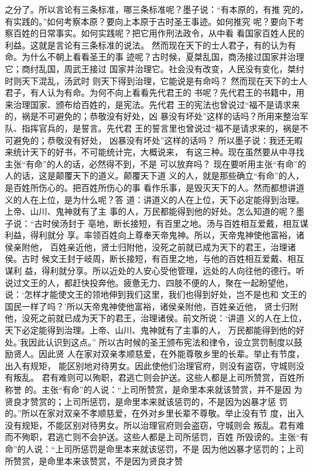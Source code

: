 \documentclass[12pt,UTF8]{ctexbook}
\begin{document}
之分了。所以言论有三条标准，哪三条标准呢？墨子说：“有本原的，有推 
究的，有实践的。”如何考察本原？要向上本原于古时圣王事迹。如何推究 
呢？要向下考察百姓的日常事实。如何实践呢？把它用作刑法政令，从中看 
看国家百姓人民的利益。这就是言论有三条标准的说法。 
然而现在天下的士人君子，有的认为有命。为什么不朝上看看圣王的事 
迹呢？古时候，夏桀乱国，商汤接过国家并治理它；商纣乱国，周武王接过 
国家并治理它。社会没有改变，人民没有变化，桀纣时则天下混乱，汤武时 
则天下得到治理，它能说是有命吗？ 
然而现在天下的士人君子，有人认为有命。为何不向上看看先代君王的 
书呢？先代君王的书籍中，用来治理国家、颁布给百姓的，是宪法。先代君 
王的宪法也曾说过“福不是请求来的，祸是不可避免的；恭敬没有好处，凶 
暴没有坏处”这样的话吗？所用来整治军队、指挥官兵的，是誓言。先代君 
王的誓言里也曾说过“福不是请求来的，祸是不可避免的；恭敬没有好处， 
凶暴没有坏处”这样的话吗？ 
所以墨子说：我还无暇来统计天下的好书，不可能统计完，大概说来， 
有这三种。现在虽然要从中寻找主张“有命”的人的话，必然得不到，不是 
可以放弃吗？ 
现在要听用主张“有命”的人的话，这是颠覆天下的道义。颠覆天下道 
义的人，就是那些确立“有命”的人，是百姓所伤心的。把百姓所伤心的事 
看作乐事，是毁灭天下的人。然而都想讲道义的人在上位，是为什么呢？答 
道：讲道义的人在上位，天下必定能得到治理。上帝、山川、鬼神就有了主 
事的人，万民都能得到他的好处。怎么知道的呢？墨子说：“古时侯汤封于 
亳地，断长接短，有百里之地。汤与百姓相互爱戴，相互谋利益，得利就分 
享。率领百姓向上尊奉天帝鬼神。所以，天帝鬼神使他富裕，诸侯亲附他， 
百姓亲近他，贤士归附他，没死之前就已成为天下的君王，治理诸侯。古时 
候文王封于岐周，断长接短，有百里之地，与他的百姓相互爱戴、相互谋利 
益，得利就分享。所以近处的人安心受他管理，远处的人向往他的德行。听 
说过文王的人，都赶快投奔他。疲惫无力、四肢不便的人，聚在一起盼望他， 
说：‘怎样才能使文王的领地伸到我们这里，我们也得到好处，岂不是也和 
文王的国民一样了吗？’所以天帝鬼神使他富裕，诸侯亲附他，百姓亲近他， 
贤士归附他，没死之前就已成为天下的君王，治理诸侯。前文所说：‘讲道 
义的人在上位，天下必定能得到治理。上帝、山川、鬼神就有了主事的人， 
万民都能得到他的好处。’我因此认识到这点。” 
所以古时候的圣王颁布宪法和律令，设立赏罚制度以鼓励贤人。因此贤 
人在家对双亲孝顺慈爱，在外能尊敬乡里的长辈。举止有节度，出入有规矩， 
能区别地对待男女。因此使他们治理官府，则没有盗窃，守城则没有叛乱。 
君有难则可以殉职，君逃亡则会护送。这些人都是上司所赞赏，百姓所称誉 
的。主张“有命”的人说：“上司所赞赏，是命里本来就该赞赏，并不是因 
为贤良才赞赏的；上司所惩罚，是命里本来就该惩罚的，不是因为凶暴才惩 
罚的。”所以在家对双亲不孝顺慈爱，在外对乡里长辈不尊敬。举止没有节 
度，出入没有规矩，不能区别对待男女。所以治理官府则会盗窃，守城则会 
叛乱。君有难而不殉职，君逃亡则不会护送。这些人都是上司所惩罚，百姓 
所毁谤的。主张“有命”的人说：“上司所惩罚是命里本来就该惩罚，不是 
因为他凶暴才惩罚的；上司所赞赏，是命里本来该赞赏，不是因为贤良才赞 
\end{document}
